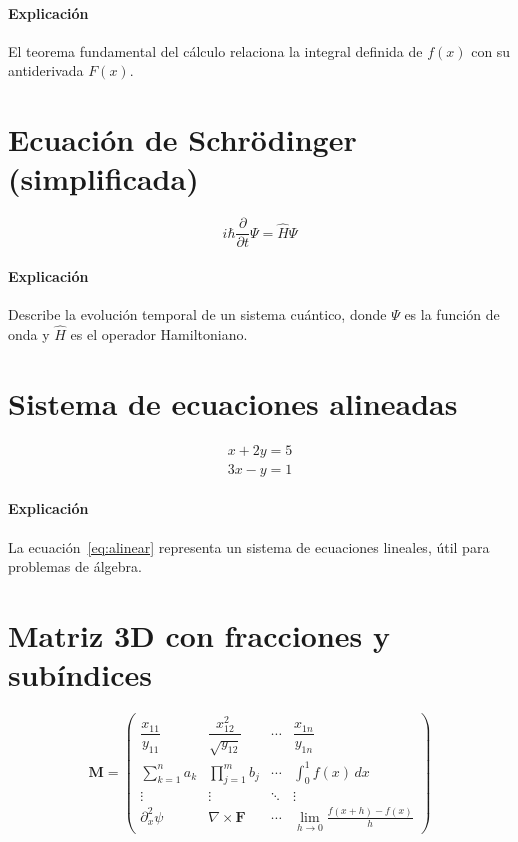 \paragraph*{Explicación} El teorema fundamental del cálculo relaciona la integral definida de $f(x)$ con su antiderivada $F(x)$.

\section{Ecuación de Schrödinger (simplificada)}

\[
i\hbar \frac{\partial}{\partial t} \Psi = \hat{H} \Psi
\]

\paragraph*{Explicación} Describe la evolución temporal de un sistema cuántico, donde $Ψ$ es la función de onda y $\hat{H}$ es el operador Hamiltoniano.

\section{Sistema de ecuaciones alineadas}

\begin{align}
\label{eq:alinear}
	x + 2y = 5 \\
	3x - y = 1
\end{align}

\paragraph*{Explicación} La ecuación~\ref{eq:alinear} representa un sistema de ecuaciones lineales, útil para problemas de álgebra.

\section{Matriz 3D con fracciones y subíndices}

\[
\mathbf{M} = \begin{pmatrix}
	\dfrac{x_{11}}{y_{11}} & \dfrac{x_{12}^2}{\sqrt{y_{12}}} & \cdots & \dfrac{x_{1n}}{y_{1n}} \\
	\sum_{k=1}^n a_k & \prod_{j=1}^m b_j & \cdots & \int_0^1 f(x)\,dx \\
	\vdots & \vdots & \ddots & \vdots \\
	\partial_x^2 \psi & \nabla \times \mathbf{F} & \cdots & \lim_{h \to 0} \frac{f(x+h)-f(x)}{h}
\end{pmatrix}
\]

